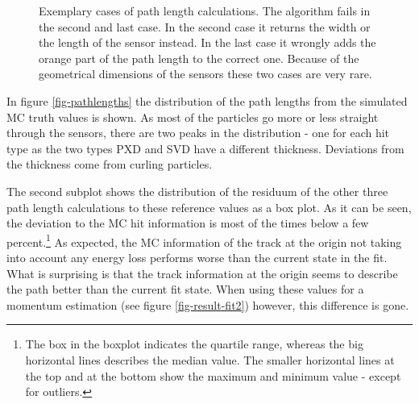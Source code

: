 \begin{figure}
  \caption[Exemplary cases of path length calculations.]{Exemplary cases of path length calculations. The algorithm fails in the second and last case. In the second case it returns the width or the length of the sensor instead. In the last case it wrongly adds the orange part of the path length to the correct one. Because of the geometrical dimensions of the sensors these two cases are very rare.}
  \label{fig-errors-in-path-length}
\end{figure}

In figure \ref{fig-pathlengths} the distribution of the path lengths from the simulated MC truth values is shown. As most of the particles go more or less straight through the sensors, there are two peaks in the distribution - one for each hit type as the two types PXD and SVD have a different thickness. Deviations from the thickness come from curling particles.

The second subplot shows the distribution of the residuum of the other three path length calculations to these reference values as a box plot. As it can be seen, the deviation to the MC hit information is most of the times below a few percent.\footnote{The box in the boxplot indicates the quartile range, whereas the big horizontal lines describes the median value. The smaller horizontal lines at the top and at the bottom show the maximum and minimum value - except for outliers.} As expected, the MC information of the track at the origin not taking into account any energy loss performs worse than the current state in the fit. What is surprising is that the track information at the origin seems to describe the path better than the current fit state. When using these values for a momentum estimation (see figure \ref{fig-result-fit2}) however, this difference is gone.


